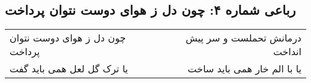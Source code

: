 \begin{center}
\section*{رباعی شماره ۴: چون دل ز هوای دوست نتوان پرداخت}
\label{sec:004}
\begin{longtable}{l p{0.5cm} r}
چون دل ز هوای دوست نتوان پرداخت
&&
درمانش تحملست و سر پیش انداخت
\\
یا ترک گل لعل همی باید گفت
&&
یا با الم خار همی باید ساخت
\\
\end{longtable}
\end{center}
